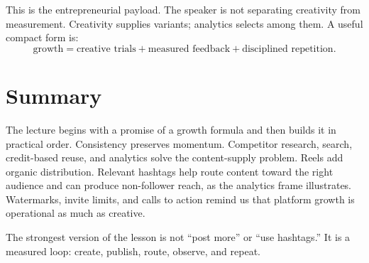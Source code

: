 This is the entrepreneurial payload. The speaker is not separating creativity from measurement. Creativity supplies variants; analytics selects among them. A useful compact form is:
\begin{equation}
\text{growth}
=
\text{creative trials}
+
\text{measured feedback}
+
\text{disciplined repetition}.
\end{equation}

\section{Summary}

The lecture begins with a promise of a growth formula and then builds it in practical order. Consistency preserves momentum. Competitor research, search, credit-based reuse, and analytics solve the content-supply problem. Reels add organic distribution. Relevant hashtags help route content toward the right audience and can produce non-follower reach, as the analytics frame illustrates. Watermarks, invite limits, and calls to action remind us that platform growth is operational as much as creative.

The strongest version of the lesson is not ``post more'' or ``use hashtags.'' It is a measured loop: create, publish, route, observe, and repeat.